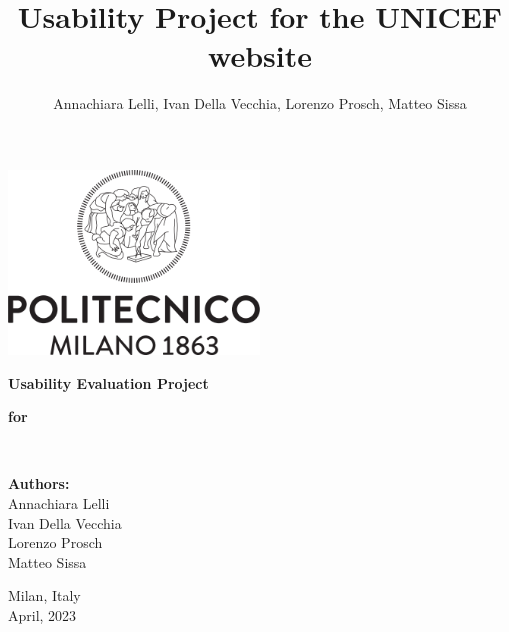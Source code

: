 \documentclass[a4paper,12pt]{article}
\author{Annachiara Lelli, Ivan Della Vecchia, Lorenzo Prosch, Matteo Sissa}
\title{Usability Project for the UNICEF website}
\newcommand{\inspectionDir}{root/1.Inspection}
\newcommand{\utDir}{root/2.UserTesting}
\newcommand{\conclusionDir}{root/3.Conclusion}
\newcommand{\annexDir}{root/4.Annex}
\begin{document}
	
	\begin{center}
		\includegraphics[width=0.5\textwidth]{res/Logo_poli}
	
	\vspace{3cm}
	
	\textbf{\fontsize{20}{\baselineskip}\selectfont Usability Evaluation Project}\\
	
	\vspace{0.6cm}
	
	\textbf{\fontsize{15}{\baselineskip}\selectfont for }\\
	
	\vspace{0.6cm}
	
	\textbf{\fontsize{20}{\baselineskip}\selectfont {Unicef's website}}\\
	
	\vspace{3.3cm}
	
	
		\textbf{Authors:}\\
	{
		\setlength{\baselineskip}{1.4\baselineskip}
		Annachiara Lelli\\
		Ivan Della Vecchia\\
		Lorenzo Prosch\\
		Matteo Sissa	\\
	}
	
		\vspace{4cm}
	
	{\small Milan, Italy \\ April, 2023}
	
	

	

	
	\end{center}
	
	
	\clearpage
 	\hypersetup{linkcolor=black}
	\tableofcontents
	
	\renewcommand{\rmdefault}{phv}
	\renewcommand{\normalsize}{\fontsize{14}{17.4}\selectfont}
	
	
	
	
	
	
	
\end{document}
